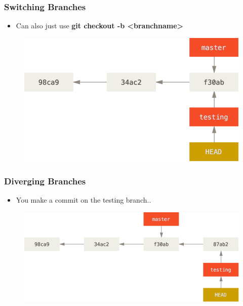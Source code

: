 \documentclass{beamer}
\begin{document}
\begin{frame}
	\frametitle{Switching Branches}
	\begin{itemize}
		\item{Can also just use  \textbf{git checkout -b \textless{}branchname\textgreater{}}}
	\end{itemize}
	\begin{figure}
		\includegraphics[scale=0.32]{Switching_Branches-1.png}
	\end{figure}
\end{frame}

\begin{frame}
	\frametitle{Diverging Branches}
	\begin{itemize}
		\item{You make a commit on the testing branch..}
	\end{itemize}
	\begin{figure}
		\includegraphics[scale=0.4]{Diverging_Branches-0.png}
	\end{figure}
\end{frame}
\end{document}
